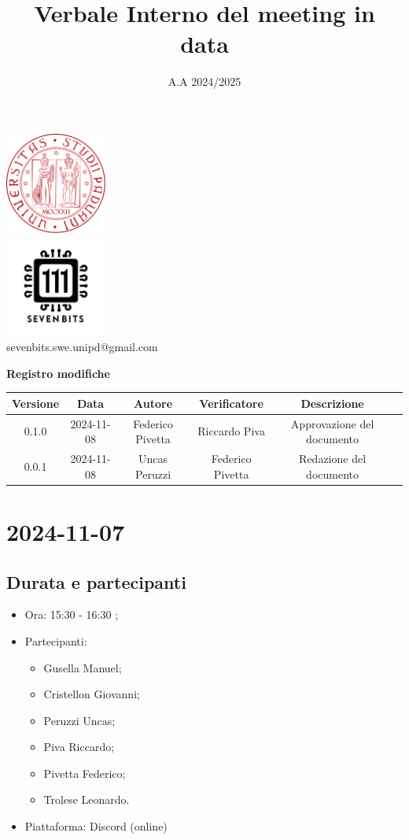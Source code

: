 \documentclass[10pt]{article}
\title{Verbale Interno del meeting in data}
\date{A.A 2024/2025}
\begin{document}
\maketitle
\center 
\includegraphics[width=0.25\textwidth]{LogoUnipd}\\
\includegraphics[width=0.25\textwidth]{Sevenbitslogo}\\
sevenbits.swe.unipd@gmail.com\\
\vspace{2mm}

\textbf{Registro modifiche}\\
\vspace{2mm}
\begin{tabular}{|c|c|c|c|c|c|}
\hline
\textbf{Versione} & \textbf{Data} & \textbf{Autore} & \textbf{Verificatore} & \textbf{Descrizione} \\
\hline
0.1.0 & 2024-11-08 & Federico Pivetta & Riccardo Piva & Approvazione del documento \\
\hline
0.0.1 & 2024-11-08 & Uncas Peruzzi & Federico Pivetta & Redazione del documento \\
\hline
\end{tabular}

\raggedright
\newpage
\tableofcontents
\newpage
\section{2024-11-07}
\subsection{Durata e partecipanti}
\begin{itemize}
\item Ora: 15:30 - 16:30 ;
\item Partecipanti: 	
	\begin{itemize}
	\item Gusella Manuel;
	\item Cristellon Giovanni;
	\item Peruzzi Uncas;
	\item Piva Riccardo;
	\item Pivetta Federico;
	\item Trolese Leonardo.
	\end{itemize}
\item Piattaforma: Discord (online)
\end{itemize}
\end{document}

